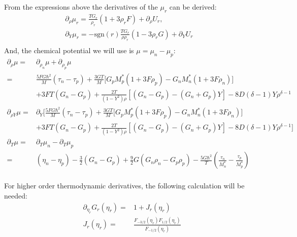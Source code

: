\documentclass[preprint,prc,preprintnumbers,superscriptaddress,amsmath,amssymb,floatfix]{revtex4-1}
\begin{document}
From the expressions above the derivatives of the $\mu_r$ can be derived:
\begin{equation}
 \begin{split}
  \partial_{\rho}\mu_r=\frac{TG_r}{\rho_r}(1+ 3\rho_r F)+\partial_{\rho}U_r,\\
  \partial_{Y}\mu_r=-\text{sgn}(r)\frac{TG_r}{\rho \rho_r}(1-3\rho_r G)+\partial_{Y}U_r&\\
 \end{split}
\end{equation}
And, the chemical potential we will use is $\mu = \mu_n-\mu_p$:
\begin{equation}
 \begin{split}
  \partial_\rho \mu=&\partial_{\rho_n} \mu+\partial_{\rho_p} \mu\\
  =&\frac{5 FG\hbar^2}{M}(\tau_n-\tau_p)+\frac{3GT}{M}\Big[G_p M^{*}_p (1+3F\rho_p)-G_n M^{*}_n(1+3F\rho_n)\Big]\\
  &+3FT(G_n-G_p)+\frac{2T}{(1-Y^2)\rho}[(G_n-G_p)-(G_n+G_p)Y]-8D(\delta-1)Y\rho^{\delta-1}\\
  \partial_{\rho Y} \mu=&\partial_Y\Big[\frac{5 FG\hbar^2}{M}(\tau_n-\tau_p)+\frac{3GT}{M}\Big[G_p M^{*}_p (1+3F\rho_p)-G_n M^{*}_n(1+3F\rho_n)\Big]\\
  &+3FT(G_n-G_p)+\frac{2T}{(1-Y^2)\rho}[(G_n-G_p)-(G_n+G_p)Y]-8D(\delta-1)Y\rho^{\delta-1}\Big]\\
  \partial_T\mu =&\partial_{T} \mu_n-\partial_{T} \mu_p\\
  =&(\eta_n-\eta_p)-\frac{3}{2}(G_n-G_p)+\frac{9}{2}G(G_n \rho_n -G_p \rho_p)-\frac{5 G \hbar^2}{T} (\frac{\tau_n}{M^{*}_n}-\frac{\tau_p}{M^{*}_p})\\
  \end{split}
\end{equation}

For higher order thermodynamic derivatives, the following calculation will be needed:
\begin{equation}
 \begin{split}
   \partial_{\eta_r}G_r(\eta_r)=&1+J_r(\eta_r)\\
   J_r(\eta_r)=&\frac{F_{-3/2}(\eta_r)F_{1/2}(\eta_r)}{F_{-1/2}(\eta_r)}
 \end{split}
\end{equation}
\end{document}
